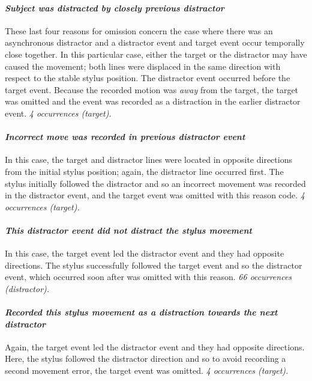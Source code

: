 \paragraph{\emph{Subject was distracted by closely previous distractor}}
These last four reasons for omission concern the case where there was
an asynchronous distractor and a distractor event and target event
occur temporally close together. In this particular case, either the
target or the distractor may have caused the movement; both lines were
displaced in the same direction with respect to the stable stylus
position. The distractor event occurred before the target
event. Because the recorded motion was \emph{away} from the target,
the target was omitted and the event was recorded as a distraction in
the earlier distractor event.  \emph{4 occurrences (target).}

\paragraph{\emph{Incorrect move was recorded in previous distractor event}}
In this case, the target and distractor lines were located in opposite
directions from the initial stylus position; again, the distractor
line occurred first. The stylus initially followed the distractor and so
an incorrect movement was recorded in the distractor event, and the
target event was omitted with this reason code. \emph{4 occurrences
  (target).}


\paragraph{\emph{This distractor event did not distract the stylus movement}}
In this case, the target event led the distractor event and they
had opposite directions. The stylus successfully followed the target
event and so the distractor event, which occurred soon after was omitted
with this reason.  \emph{66 occurrences (distractor).}

\paragraph{\emph{Recorded this stylus movement as a distraction towards the next distractor}}
Again, the target event led the distractor event and they had
opposite directions. Here, the stylus followed the distractor direction
and so to avoid recording a second movement error, the target event was
omitted. \emph{4 occurrences (target).}
